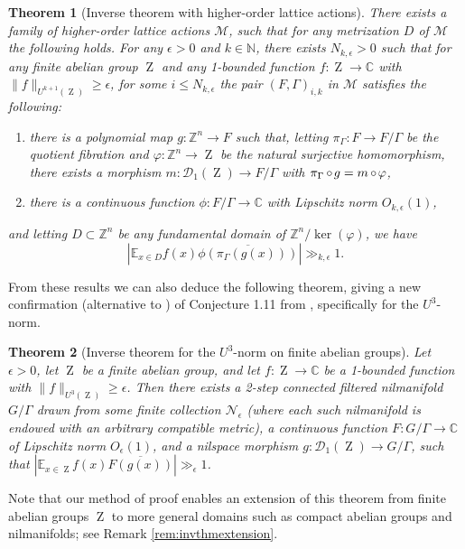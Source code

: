 \documentclass[a4paper,12pt,reqno]{amsart}
\newtheorem{theorem}{Theorem}[section]
\theoremstyle{definition}
\def\to{\rightarrow}
\newcommand{\mc}{\mathcal}
\newcommand{\mb}{\mathbb}
\DeclareMathOperator{\ab}{Z}
\DeclareMathOperator{\co}{\circ\hspace{-0.02 cm}}
\begin{document}
\begin{theorem}[Inverse theorem with higher-order lattice actions]\label{thm:inv-high-ord-latti-intro}
There exists a family of higher-order lattice actions $\mc{M}$, such that for any metrization $D$ of $\mc{M}$ the following holds.
For any $\epsilon>0$ and $k\in\mb{N}$, there exists $N_{k,\epsilon}>0$ such that for any finite abelian group $\ab$  and any 1-bounded function $f:\ab\to \mb{C}$ with $\|f\|_{U^{k+1}(\ab)}\ge \epsilon$, for some $i\leq N_{k,\epsilon}$ the pair $(F,\Gamma)_{i,k}$ in $\mc{M}$ satisfies the following:
\setlength{\leftmargini}{0.7cm}
\begin{enumerate}
    \item there is a polynomial map $g:\mb{Z}^n\to F$ such that, letting $\pi_{\Gamma}:F\to F/\Gamma$ be the quotient fibration and $\varphi:\mb{Z}^n\to\ab$ be the natural surjective homomorphism, there exists a morphism $m:\mc{D}_1(\ab)\to F/\Gamma$ with $\pi_{\Gamma}\co g = m\co \varphi$,
    \item there is a continuous function $\phi:F/\Gamma\to \mb{C}$ with Lipschitz norm $O_{k,\epsilon}(1)$,
\end{enumerate}
and letting $D\subset \mb{Z}^n$ be any fundamental domain of $\mb{Z}^n/\ker(\varphi)$, we have
\[
\left|\mb{E}_{x\in D} f(x) \overline{\phi(\pi_\Gamma(g(x)))}\right|\gg_{k,\epsilon} 1.
\]
\end{theorem}
\noindent From these results we can also deduce the following theorem, giving a new confirmation (alternative to \cite[Theorem 1.10]{J&T}) of Conjecture 1.11 from \cite{J&T}, specifically for the $U^3$-norm.
\begin{theorem}[Inverse theorem for the $U^3$-norm on finite abelian groups] 
Let $\epsilon>0$, let $\ab$ be a finite abelian group, and let $f:\ab\to \mb{C}$ be a 1-bounded function with $\|f\|_{U^{3}(\ab)}\ge \epsilon$. Then there exists a 2-step connected filtered nilmanifold $G/\Gamma$ drawn from some finite collection $\mc{N}_\epsilon$ (where each such nilmanifold is endowed with an arbitrary compatible metric), a continuous function $F:G/\Gamma\to \mb{C}$ of Lipschitz norm $O_\epsilon(1)$, and a nilspace morphism $g:\mc{D}_1(\ab)\to G/\Gamma$, such that $|\mb{E}_{x\in \ab} f(x) \overline{F(g(x))}|\gg_{\epsilon} 1$.
\end{theorem}
 \noindent Note that our method of proof enables an extension of this theorem  from finite abelian groups $\ab$ to more general domains such as compact abelian groups and nilmanifolds; see Remark \ref{rem:invthmextension}.
\end{document}
